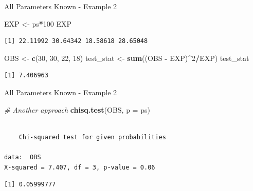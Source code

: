 \documentclass[
  ignorenonframetext,
]{beamer}
\newenvironment{Shaded}{\begin{snugshade}}{\end{snugshade}}
\newcommand{\AttributeTok}[1]{\textcolor[rgb]{0.13,0.29,0.53}{#1}}
\newcommand{\CommentTok}[1]{\textcolor[rgb]{0.56,0.35,0.01}{\textit{#1}}}
\newcommand{\DecValTok}[1]{\textcolor[rgb]{0.00,0.00,0.81}{#1}}
\newcommand{\FunctionTok}[1]{\textcolor[rgb]{0.13,0.29,0.53}{\textbf{#1}}}
\newcommand{\NormalTok}[1]{#1}
\newcommand{\OtherTok}[1]{\textcolor[rgb]{0.56,0.35,0.01}{#1}}
\newcommand{\SpecialCharTok}[1]{\textcolor[rgb]{0.81,0.36,0.00}{\textbf{#1}}}
\begin{document}
\begin{frame}[fragile]{All Parameters Known - Example 2}
\label{all-parameters-known---example-2-4}
\begin{Shaded}
\begin{Highlighting}[]
\NormalTok{EXP }\OtherTok{\textless{}{-}}\NormalTok{ ps}\SpecialCharTok{*}\DecValTok{100}
\NormalTok{EXP}
\end{Highlighting}
\end{Shaded}

\begin{verbatim}
[1] 22.11992 30.64342 18.58618 28.65048
\end{verbatim}

\begin{Shaded}
\begin{Highlighting}[]
\NormalTok{OBS }\OtherTok{\textless{}{-}} \FunctionTok{c}\NormalTok{(}\DecValTok{30}\NormalTok{, }\DecValTok{30}\NormalTok{, }\DecValTok{22}\NormalTok{, }\DecValTok{18}\NormalTok{)}
\NormalTok{test\_stat }\OtherTok{\textless{}{-}} \FunctionTok{sum}\NormalTok{((OBS }\SpecialCharTok{{-}}\NormalTok{ EXP)}\SpecialCharTok{\^{}}\DecValTok{2}\SpecialCharTok{/}\NormalTok{EXP)}
\NormalTok{test\_stat}
\end{Highlighting}
\end{Shaded}

\begin{verbatim}
[1] 7.406963
\end{verbatim}
\end{frame}

\begin{frame}[fragile]{All Parameters Known - Example 2}
\label{all-parameters-known---example-2-5}
\begin{Shaded}
\begin{Highlighting}[]
\CommentTok{\# Another approach}
\FunctionTok{chisq.test}\NormalTok{(OBS, }\AttributeTok{p =}\NormalTok{ ps)}
\end{Highlighting}
\end{Shaded}

\begin{verbatim}

    Chi-squared test for given probabilities

data:  OBS
X-squared = 7.407, df = 3, p-value = 0.06
\end{verbatim}

\begin{Shaded}
\end{Shaded}

\begin{verbatim}
[1] 0.05999777
\end{verbatim}
\end{frame}
\end{document}
